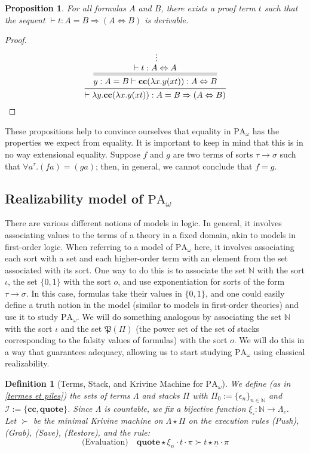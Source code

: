 \documentclass[a4paper,12pt]{article}
\newtheorem{prop}[theo]{Proposition}
\newtheorem{defi}[theo]{Definition}
\theoremstyle{rmqstyle}
\newcommand{\N}{\mathbb{N}}
\newcommand{\set}[1]{\{#1\}}
\newcommand{\PA}{\mathrm{PA}}
\renewcommand{\implies}{\Rightarrow}
\renewcommand{\P}{\mathfrak{P}}
\renewcommand{\iff}{\Leftrightarrow}
\newcommand{\cc}{\mathbf{cc}}
\newcommand{\Kri}[1]{\underline{#1}}
\begin{document}
\begin{prop}
For all formulas $A$ and $B$, there exists a proof term $t$ such that the sequent $\vdash t : A = B \implies (A \iff B)$ is derivable.
\end{prop}

\begin{proof}
$$
\begin{prooftree}[center=false]
\hypo{}
\ellipsis{}{ \vdash t : A \iff A }
\infer[double]1{y : A = B \vdash \cc(\lambda x. y(xt)) : A \iff B}
\infer1{\vdash \lambda y. \cc(\lambda x. y(xt)) : A = B \implies (A \iff B)}
\end{prooftree}
$$
\end{proof}

These propositions help to convince ourselves that equality in $\PA_\omega$ has the properties we expect from equality. It is important to keep in mind that this is in no way extensional equality. Suppose $f$ and $g$ are two terms of sorts $\tau \to \sigma$ such that $\forall a^\tau. (fa) = (ga)$; then, in general, we cannot conclude that $f = g$.

\clearpage
\subsection{Realizability model of \( \PA_\omega \)}

There are various different notions of models in logic. In general, it involves associating values to the terms of a theory in a fixed domain, akin to models in first-order logic. When referring to a model of $\PA_\omega$ here, it involves associating each sort with a set and each higher-order term with an element from the set associated with its sort. One way to do this is to associate the set $\N$ with the sort $\iota$, the set $\{0,1\}$ with the sort $o$, and use exponentiation for sorts of the form $\tau \to \sigma$. In this case, formulas take their values in $\{0,1\}$, and one could easily define a truth notion in the model (similar to models in first-order theories) and use it to study $\PA_\omega$. We will do something analogous by associating the set $\N$ with the sort $\iota$ and the set $\P(\Pi)$ (the power set of the set of stacks corresponding to the falsity values of formulas) with the sort $o$. We will do this in a way that guarantees adequacy, allowing us to start studying $\PA_\omega$ using classical realizability.

\begin{defi}[Terms, Stack, and Krivine Machine for $\PA_\omega$]
We define (as in \ref{termes et piles}) the sets of terms $\Lambda$ and stacks $\Pi$ with $\Pi_0 := \set{\epsilon_n}_{n \in \N}$ and $\mathcal{I} := \set{\cc, \mathbf{quote}}$. Since $\Lambda$ is countable, we fix a bijective function $\xi_{\square} : \N \to \Lambda_c$.\\
Let $\succ$ be the minimal Krivine machine on $\Lambda \star \Pi$ on the execution rules \textit{(Push)}, \textit{(Grab)}, \textit{(Save)}, \textit{(Restore)}, and the rule:
$$\text{(Evaluation)} \quad \mathbf{quote} \star \xi_n \cdot t \cdot \pi \succ t \star \Kri{n} \cdot \pi$$
\end{defi}
\end{document}

